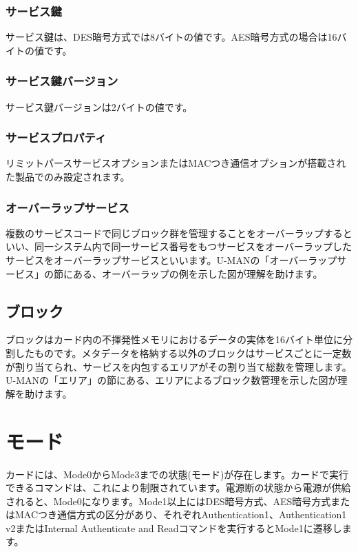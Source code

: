 \documentclass[a4paper]{report}
\begin{document}
\subsection{サービス鍵}
サービス鍵は、DES暗号方式では8バイトの値です。AES暗号方式の場合は16バイトの値です。

\subsection{サービス鍵バージョン}

サービス鍵バージョンは2バイトの値です。

\subsection{サービスプロパティ}

リミットパースサービスオプションまたはMACつき通信オプションが搭載された製品でのみ設定されます。

\subsection{オーバーラップサービス}

複数のサービスコードで同じブロック群を管理することをオーバーラップするといい、同一システム内で同一サービス番号をもつサービスをオーバーラップしたサービスをオーバーラップサービスといいます。U-MAN\cite{felica-usersmanual}の「オーバーラップサービス」の節にある、オーバーラップの例を示した図が理解を助けます。

\section{ブロック}

ブロックはカード内の不揮発性メモリにおけるデータの実体を16バイト単位に分割したものです。メタデータを格納する以外のブロックはサービスごとに一定数が割り当てられ、サービスを内包するエリアがその割り当て総数を管理します。U-MAN\cite{felica-usersmanual}の「エリア」の節にある、エリアによるブロック数管理を示した図が理解を助けます。

\chapter{モード}

カードには、Mode0からMode3までの状態(モード)が存在します。カードで実行できるコマンドは、これにより制限されています。電源断の状態から電源が供給されると、Mode0になります。Mode1以上にはDES暗号方式、AES暗号方式またはMACつき通信方式の区分があり、それぞれAuthentication1、Authentication1 v2またはInternal Authenticate and Readコマンドを実行するとMode1に遷移します。
\end{document}
